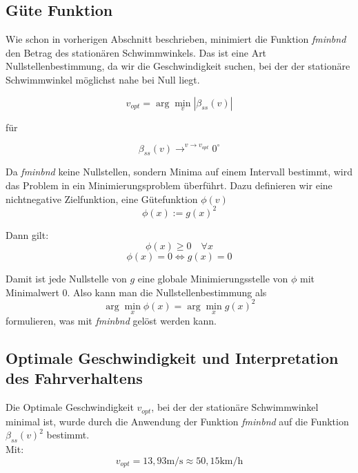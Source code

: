 \newpage
\subsection{Güte Funktion}
Wie schon in vorherigen Abschnitt beschrieben, minimiert die Funktion \emph{fminbnd} den Betrag des stationären Schwimmwinkels. Das ist eine Art 
Nullstellenbestimmung, da wir die Geschwindigkeit suchen, bei der der stationäre Schwimmwinkel möglichst nahe bei Null liegt.

\begin{equation*}
    v_{opt} = \arg\min_{v} |\beta_{ss}(v)|
\end{equation*}

für 

\begin{equation*}
    \beta_{ss}(v) \rightarrow^{v \to v_{opt}} 0^{\circ}
\end{equation*}


Da \emph{fminbnd} keine Nullstellen, sondern Minima auf einem Intervall bestimmt, wird das Problem in ein Minimierungsproblem überführt. Dazu definieren wir eine nichtnegative Zielfunktion, eine Gütefunktion $\phi(v)$
\begin{equation*}
    \phi(x) := g(x)^2
\end{equation*}

Dann gilt:
\begin{equation*}
    \phi(x) \geq 0 \quad \forall x
\end{equation*}
\begin{equation*}
    \phi(x) = 0 \Leftrightarrow g(x) = 0
\end{equation*}

Damit ist jede Nullstelle von $g$ eine globale Minimierungsstelle von $\phi$ mit Minimalwert 0.
Also kann man die Nullstellenbestimmung als
\begin{equation*}
    \arg\min_{x} \phi(x) = \arg\min_{x} g(x)^2
\end{equation*}
formulieren, was mit \emph{fminbnd} gelöst werden kann.

\newpage

\subsection{Optimale Geschwindigkeit und Interpretation des Fahrverhaltens}

Die Optimale Geschwindigkeit $v_{opt}$, bei der der stationäre Schwimmwinkel minimal ist, wurde durch die Anwendung der Funktion \emph{fminbnd} auf die Funktion $\beta_{ss}(v)^2$ bestimmt. 
\\Mit: 
\begin{equation*}
    v_{opt} = 13,93 \mathrm{m/s} \approx 50,15 \mathrm{km/h}
\end{equation*}

